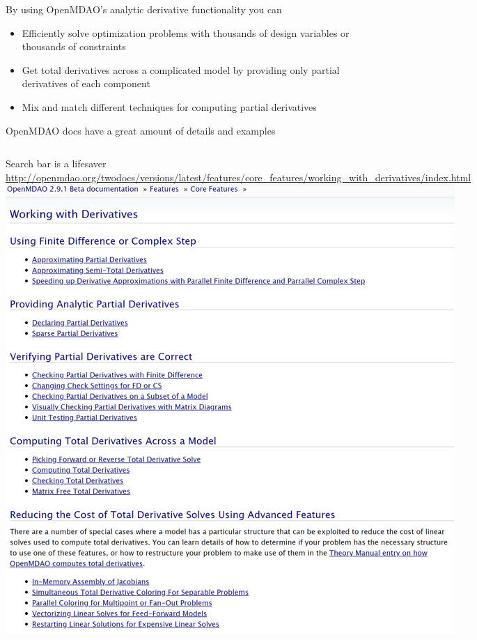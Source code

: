 \documentclass[aspectratio=169, usenames, dvipsnames, 14pt]{beamer}
\begin{document}
\begin{frame}{By using OpenMDAO's analytic derivative functionality you can}
	\begin{itemize}
		\item Efficiently solve optimization problems with thousands of design variables or thousands of constraints
		\item Get total derivatives across a complicated model by providing only partial derivatives of each component
		\item Mix and match different techniques for computing partial derivatives
	\end{itemize}
\end{frame}

\begin{frame}{OpenMDAO docs have a great amount of details and examples}

	\begin{columns}
			Search bar is a lifesaver
			\newline \newline \newline \newline \url{http://openmdao.org/twodocs/versions/latest/features/core_features/working_with_derivatives/index.html}
			\includegraphics[scale=.37]{images/slide_24_derivatives.png}
	\end{columns}

\end{frame}
\end{document}
